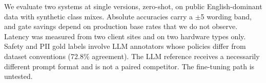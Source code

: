 We evaluate two systems at single versions, zero-shot, on public English-dominant data with synthetic class mixes. Absolute accuracies carry a $\pm$5\pp{} wording band, and gate savings depend on production base rates that we do not observe. Latency was measured from two client sites and on two hardware types only. Safety and PII gold labels involve LLM annotators whose policies differ from dataset conventions (72.8\% agreement). The LLM reference receives a necessarily different prompt format and is not a paired competitor. The \laya{} fine-tuning path is untested.

